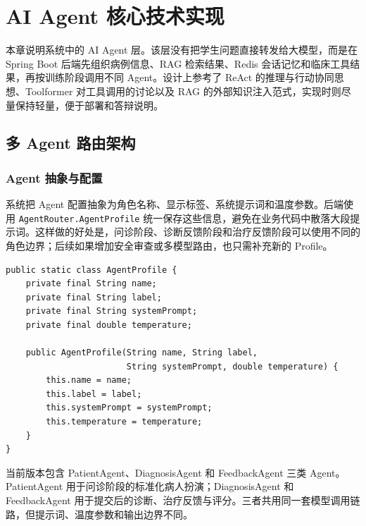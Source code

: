 \chapter{AI Agent 核心技术实现}

本章说明系统中的 AI Agent 层。该层没有把学生问题直接转发给大模型，而是在 Spring Boot 后端先组织病例信息、RAG 检索结果、Redis 会话记忆和临床工具结果，再按训练阶段调用不同 Agent。设计上参考了 ReAct 的推理与行动协同思想\cite{yao2023react}、Toolformer 对工具调用的讨论\cite{schick2023toolformer}以及 RAG 的外部知识注入范式\cite{lewis2020rag}，实现时则尽量保持轻量，便于部署和答辩说明。

\section{多 Agent 路由架构}

\subsection{Agent 抽象与配置}

系统把 Agent 配置抽象为角色名称、显示标签、系统提示词和温度参数。后端使用 \texttt{AgentRouter.AgentProfile} 统一保存这些信息，避免在业务代码中散落大段提示词。这样做的好处是，问诊阶段、诊断反馈阶段和治疗反馈阶段可以使用不同的角色边界；后续如果增加安全审查或多模型路由，也只需补充新的 Profile。

\begin{lstlisting}[style=java, caption={Agent 配置抽象 \texttt{AgentProfile}（节选）}, label={lst:agent_profile}]
public static class AgentProfile {
    private final String name;
    private final String label;
    private final String systemPrompt;
    private final double temperature;

    public AgentProfile(String name, String label,
                        String systemPrompt, double temperature) {
        this.name = name;
        this.label = label;
        this.systemPrompt = systemPrompt;
        this.temperature = temperature;
    }
}
\end{lstlisting}

当前版本包含 PatientAgent、DiagnosisAgent 和 FeedbackAgent 三类 Agent。PatientAgent 用于问诊阶段的标准化病人扮演；DiagnosisAgent 和 FeedbackAgent 用于提交后的诊断、治疗反馈与评分。三者共用同一套模型调用链路，但提示词、温度参数和输出边界不同。

